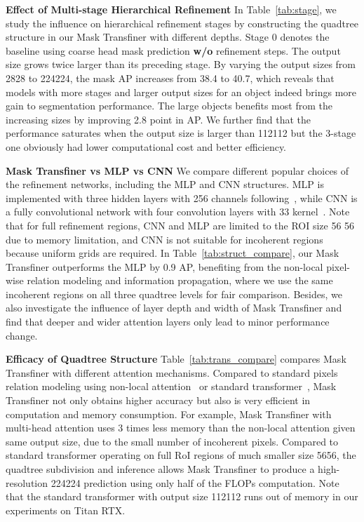 \documentclass[10pt,twocolumn,letterpaper]{article}
\newcommand{\parsection}[1]{\vspace{1mm}\noindent\textbf{#1}}
\begin{document}
\parsection{Effect of Multi-stage Hierarchical Refinement} 
In Table~\ref{tab:stage}, we study the influence on hierarchical refinement stages by constructing the quadtree structure in our Mask Transfiner with different depths. Stage 0 denotes the baseline using coarse head mask prediction \textbf{w/o} refinement steps. The output size grows twice larger than its preceding stage. By varying the output sizes from 2828 to 224224, the mask AP increases from 38.4 to 40.7, which reveals that models with more stages and larger output sizes for an object indeed brings more gain to segmentation performance. The large objects benefits most from the increasing sizes by improving 2.8 point in AP. We further find that the performance saturates when the output size is larger than 112112 but the 3-stage one obviously had lower computational cost and better efficiency. 

\parsection{Mask Transfiner vs MLP vs CNN}
We compare different popular choices of the refinement networks, including the MLP and CNN structures. MLP is implemented with three hidden layers with 256 channels following~\cite{kirillov2020pointrend}, while CNN is a fully convolutional network with four convolution layers with 33 kernel~\cite{he2017mask}.
Note that for full refinement regions, CNN and MLP are limited to the ROI size 56  56 due to memory limitation, and CNN is not suitable for incoherent regions because uniform grids are required.
In Table~\ref{tab:struct_compare}, our Mask Transfiner outperforms the MLP by 0.9 AP, benefiting from the non-local pixel-wise relation modeling and information propagation, where we use the same incoherent regions on all three quadtree levels for fair comparison.
Besides, we also investigate the influence of layer depth  and width  of Mask Transfiner and find that deeper and wider attention layers only lead to minor performance change.


\parsection{Efficacy of Quadtree Structure} 
Table~\ref{tab:trans_compare} compares Mask Transfiner with different attention mechanisms. Compared to standard pixels relation modeling using non-local attention~\cite{wang2018non} or standard transformer~\cite{carion2020end}, Mask Transfiner not only obtains higher accuracy but also is very efficient in computation and memory consumption. For example, Mask Transfiner with multi-head attention uses 3 times less memory than the non-local attention given  same output size, due to the small number of incoherent pixels. Compared to standard transformer operating on full RoI regions of much smaller size 5656, the quadtree subdivision and inference allows Mask Transfiner to produce a high-resolution 224224 prediction using only half of the FLOPs computation. Note that the standard transformer with output size 112112 runs out of memory in our experiments on Titan RTX.
\end{document}
